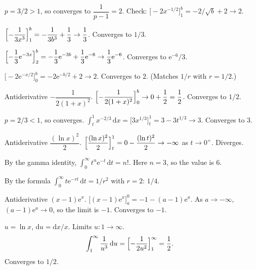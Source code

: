 \begin{solutions}
  \item $p=3/2>1$, so converges to $\dfrac{1}{p-1}=2$. Check:
        $\displaystyle\bigl[-2x^{-1/2}\bigr]_{1}^{b}=-2/\sqrt{b}+2\to 2$.

  \item $\displaystyle\Bigl[-\frac{1}{3x^{3}}\Bigr]_{1}^{b}
        =-\frac{1}{3b^{3}}+\frac{1}{3}\to\frac{1}{3}$. Converges to
        $1/3$.

  \item $\displaystyle\Bigl[-\frac{1}{3}\mathrm{e}^{-3x}\Bigr]_{2}^{b}
        =-\frac{1}{3}\mathrm{e}^{-3b}+\frac{1}{3}\mathrm{e}^{-6}
        \to\frac{1}{3}\mathrm{e}^{-6}$. Converges to $\mathrm{e}^{-6}/3$.

  \item $\displaystyle\bigl[-2\mathrm{e}^{-x/2}\bigr]_{0}^{b}
        =-2\mathrm{e}^{-b/2}+2\to 2$. Converges to $2$. (Matches $1/r$
        with $r=1/2$.)

  \item Antiderivative $-\dfrac{1}{2(1+x)^{2}}$.
        $\displaystyle\Bigl[-\frac{1}{2(1+x)^{2}}\Bigr]_{0}^{b}
        \to 0+\frac{1}{2}=\frac{1}{2}$. Converges to $1/2$.

  \item $p=2/3<1$, so converges.
        $\displaystyle\int_{t}^{1} x^{-2/3}\,\mathrm{d}x
        =\bigl[3x^{1/3}\bigr]_{t}^{1}=3-3t^{1/3}\to 3$. Converges to
        $3$.

  \item Antiderivative $\dfrac{(\ln x)^{2}}{2}$.
        $\displaystyle\Bigl[\frac{(\ln x)^{2}}{2}\Bigr]_{t}^{1}
        =0-\frac{(\ln t)^{2}}{2}\to-\infty$ as $t\to 0^{+}$. Diverges.

  \item By the gamma identity,
        $\int_{0}^{\infty} t^{n}\mathrm{e}^{-t}\,\mathrm{d}t=n!$. Here
        $n=3$, so the value is $6$.

  \item By the formula
        $\int_{0}^{\infty} t\mathrm{e}^{-rt}\,\mathrm{d}t=1/r^{2}$ with
        $r=2$: $1/4$.

  \item Antiderivative $(x-1)\mathrm{e}^{x}$.
        $\bigl[(x-1)\mathrm{e}^{x}\bigr]_{a}^{0}=-1-(a-1)\mathrm{e}^{a}$.
        As $a\to-\infty$, $(a-1)\mathrm{e}^{a}\to 0$, so the limit is
        $-1$. Converges to $-1$.

  \item $u=\ln x$, $\mathrm{d}u=\mathrm{d}x/x$. Limits $u:1\to\infty$.
        \[
          \int_{1}^{\infty} \frac{1}{u^{3}}\,\mathrm{d}u
            =\Bigl[-\frac{1}{2u^{2}}\Bigr]_{1}^{\infty}=\frac{1}{2} .
        \]
        Converges to $1/2$.


\end{solutions}
